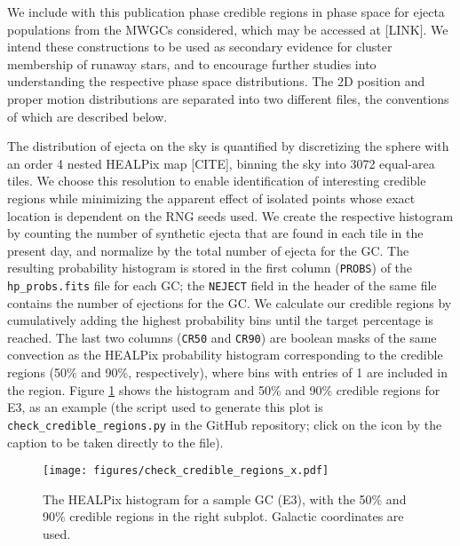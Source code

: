 \documentclass[twocolumn]{aastex631}
\begin{document}
We include with this publication phase credible regions in phase space for ejecta populations from the MWGCs considered, which may be accessed at [LINK].
We intend these constructions to be used as secondary evidence for cluster membership of runaway stars, and to encourage further studies into understanding the respective phase space distributions.
The 2D position and proper motion distributions are separated into two different files, the conventions of which are described below.

The distribution of ejecta on the sky is quantified by discretizing the sphere with an order 4 nested HEALPix map [CITE], binning the sky into 3072 equal-area tiles.
We choose this resolution to enable identification of interesting credible regions while minimizing the apparent effect of isolated points whose exact location is dependent on the RNG seeds used.
We create the respective histogram by counting the number of synthetic ejecta that are found in each tile in the present day, and normalize by the total number of ejecta for the GC.
The resulting probability histogram is stored in the first column (\texttt{PROBS}) of the \texttt{hp\_probs.fits} file for each GC; the \texttt{NEJECT} field in the header of the same file contains the number of ejections for the GC.
We calculate our credible regions by cumulatively adding the highest probability bins until the target percentage is reached.
The last two columns (\texttt{CR50} and \texttt{CR90}) are boolean masks of the same convection as the HEALPix probability histogram corresponding to the credible regions (50\% and 90\%, respectively), where bins with entries of 1 are included in the region.
Figure \ref{fig:check_credible_regions_x} shows the histogram and 50\% and 90\% credible regions for E3, as an example (the script used to generate this plot is \texttt{check\_credible\_regions.py} in the GitHub repository; click on the icon by the caption to be taken directly to the file).

\begin{figure}
    \centering
    \texttt{[image: figures/check\_credible\_regions\_x.pdf]}
    \caption{
        The HEALPix histogram for a sample GC (E3), with the 50\% and 90\% credible regions in the right subplot.
        Galactic coordinates are used.
    }
    \label{fig:check_credible_regions_x}
\end{figure}
\end{document}
